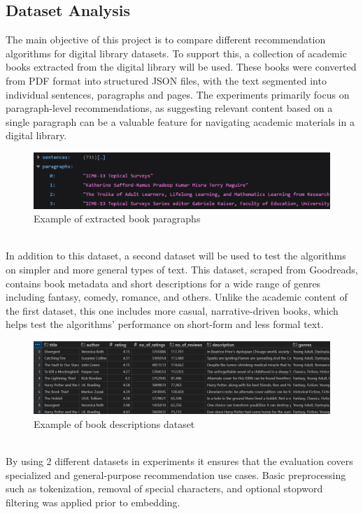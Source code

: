 \documentclass[\myFontSize,a4paper,oneside,english,hidelinks]{article}
\begin{document}
%
%

\subsection{Dataset Analysis}
The main objective of this project is to compare different recommendation algorithms for digital library datasets. To support this, a collection of academic books extracted from the digital library will be used. These books were converted from PDF format into structured JSON files, with the text segmented into individual sentences, paragraphs and pages. The experiments primarily focus on paragraph-level recommendations, as suggesting relevant content based on a single paragraph can be a valuable feature for navigating academic materials in a digital library.
%
\begin{figure}[h!]
    \centering
    \includegraphics[width=1\textwidth]{img/json_example2.png}
    \caption{Example of extracted book paragraphs}
    \label{fig:extracted_paragraph_example}
\end{figure}\\
%
In addition to this dataset, a second dataset will be used to test the algorithms on simpler and more general types of text. This dataset, scraped from Goodreads, contains book metadata and short descriptions for a wide range of genres including fantasy, comedy, romance, and others. Unlike the academic content of the first dataset, this one includes more casual, narrative-driven books, which helps test the algorithms’ performance on short-form and less formal text.
%
\begin{figure}[h!]
    \centering
    \includegraphics[width=1\textwidth]{img/rating_data_example2.png}
    \caption{Example of book descriptions dataset \cite{goodreads_kumar_2022}}
    \label{fig:book_description_dataset_example}
\end{figure}\\
%
By using 2 different datasets in experiments it ensures that the evaluation covers specialized and general-purpose recommendation use cases. Basic preprocessing such as tokenization, removal of special characters, and optional stopword filtering was applied prior to embedding.\\
%
%
%
\end{document}
